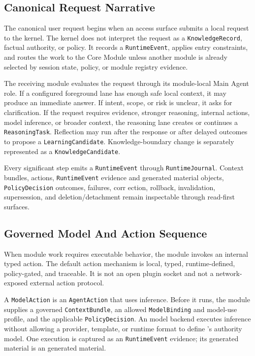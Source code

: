 \subsection{Canonical Request Narrative}

The canonical user request begins when an access surface submits a local request to the kernel. The kernel does not interpret the request as a \texttt{KnowledgeRecord}, factual authority, or policy. It records a \texttt{RuntimeEvent}, applies entry constraints, and routes the work to the Core Module unless another module is already selected by session state, policy, or module registry evidence.

The receiving module evaluates the request through its module-local Main Agent role. If a configured foreground lane has enough safe local context, it may produce an immediate answer. If intent, scope, or risk is unclear, it asks for clarification. If the request requires evidence, stronger reasoning, internal actions, model inference, or broader context, the reasoning lane creates or continues a \texttt{ReasoningTask}. Reflection may run after the response or after delayed outcomes to propose a \texttt{LearningCandidate}. Knowledge-boundary change is separately represented as a \texttt{KnowledgeCandidate}.

Every significant step emits a \texttt{RuntimeEvent} through \texttt{RuntimeJournal}. Context bundles, actions, \texttt{RuntimeEvent} evidence and generated material objects, \texttt{PolicyDecision} outcomes, failures,
corr ection, rollback, invalidation, supersession, and deletion/detachment remain inspectable through read-first surfaces.

\subsection{Governed Model And Action Sequence}

When module work requires executable behavior, the module invokes an internal typed action. The default action mechanism is local, typed, runtime-defined, policy-gated, and traceable. It is not an open plugin socket and not a network-exposed external action protocol.

A \texttt{ModelAction} is an \texttt{AgentAction} that uses inference. Before it runs, the module supplies a governed \texttt{ContextBundle}, an allowed \texttt{ModelBinding} and model-use profile, and the applicable \texttt{PolicyDecision}. An model backend executes inference without allowing a provider, template, or runtime format to define \Madre's authority model. One execution is captured as an \texttt{RuntimeEvent} evidence; its generated material is an generated material.

